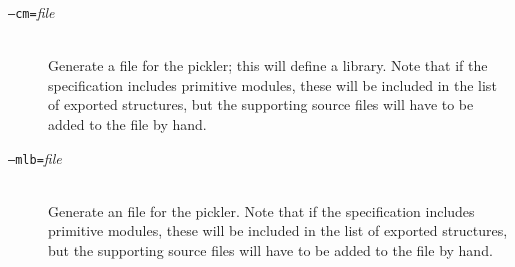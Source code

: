 \begin{description}
  \item[\normalfont\texttt{--cm=}\textit{file}] \mbox{}\\
    Generate a \cm{} file for the pickler; this will define a \cm{} library.
    Note that if the \asdl{} specification includes primitive modules, these
    will be included in the list of exported structures, but the supporting source
    files will have to be added to the \cm{} file by hand.
  \item[\normalfont\texttt{--mlb=}\textit{file}] \mbox{}\\
    Generate an \mlb{} file for the pickler.
    Note that if the \asdl{} specification includes primitive modules, these
    will be included in the list of exported structures, but the supporting source
    files will have to be added to the \mlb{} file by hand.
\end{description}%


